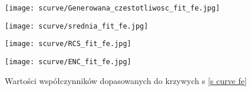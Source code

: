\begin{figure}
        \begin{multicols}{2}
                \texttt{[image: scurve/Generowana\_czestotliwosc\_fit\_fe.jpg]} \par
                \texttt{[image: scurve/srednia\_fit\_fe.jpg]} \par       
        \end{multicols} \hfill
        \begin{multicols}{2}
                \texttt{[image: scurve/RCS\_fit\_fe.jpg]} \par
                \texttt{[image: scurve/ENC\_fit\_fe.jpg]} \par
        \end{multicols}
        \caption{Wartości współczynników dopasowanych do krzywych s \ref{s curve fe}}
        \label{wyk wsp fe}
\end{figure}